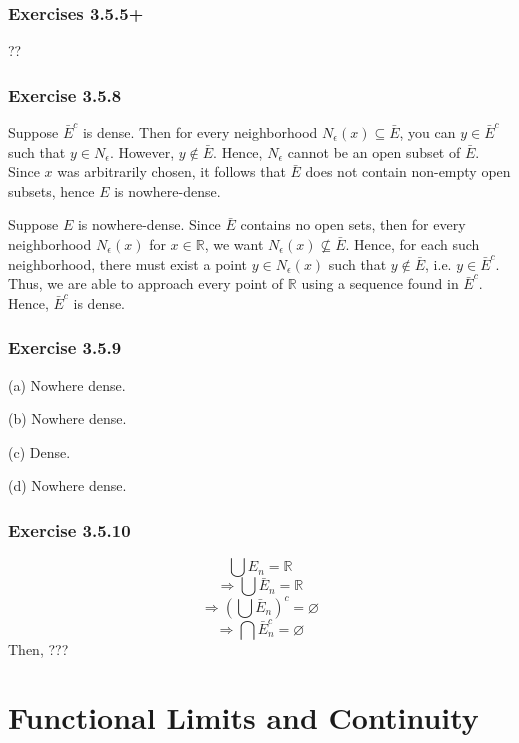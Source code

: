 \documentclass{book}
\begin{document}
\subsection*{Exercises 3.5.5+}
??

\subsection*{Exercise 3.5.8}
Suppose $\bar{E}^c$ is dense. Then for every neighborhood $N_\epsilon (x) \subseteq \bar{E}$, you can $y \in \bar{E}^c$ such that $y \in N_\epsilon$. However, $y \not \in \bar{E}$. Hence, $N_\epsilon$ cannot be an open subset of $\bar{E}$. Since $x$ was arbitrarily chosen, it follows that $\bar{E}$ does not contain non-empty open subsets, hence $E$ is nowhere-dense.

Suppose $E$ is nowhere-dense. Since $\bar{E}$ contains no open sets, then for every neighborhood $N_\epsilon (x)$ for $x \in \mathbb{R}$, we want $N_\epsilon (x) \not \subseteq \bar{E}$. Hence, for each such neighborhood, there must exist a point $y \in N_\epsilon (x)$ such that $y \not \in \bar{E}$, i.e. $y \in \bar{E}^c$. Thus, we are able to approach every point of $\mathbb{R}$ using a sequence found in $\bar{E}^c$. Hence, $\bar{E}^c$ is dense.

\subsection*{Exercise 3.5.9}
(a)
Nowhere dense.

\noindent
(b)
Nowhere dense.

\noindent
(c)
Dense.

\noindent
(d)
Nowhere dense.

\subsection*{Exercise 3.5.10}
$$\bigcup E_n = \mathbb{R}$$
$$\Rightarrow \bigcup \bar{E}_n = \mathbb{R}$$
$$\Rightarrow \left( \bigcup \bar{E}_n \right)^c = \varnothing$$
$$\Rightarrow \bigcap \bar{E}_n^c = \varnothing$$
Then, ???

\chapter{Functional Limits and Continuity}

\section{}
\end{document}
